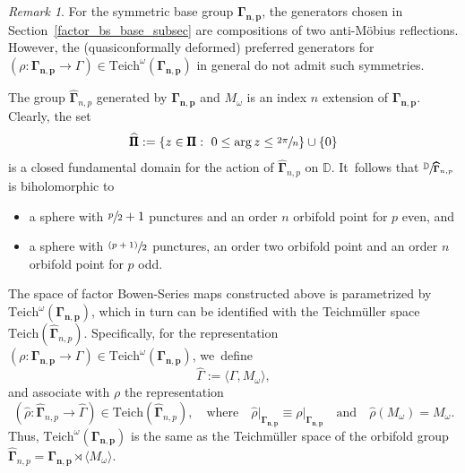\documentclass[JEP,XML,SOM,Unicode,NoFloatCountersInSection,published]{cedram}
\newcommand{\psfrac}[2]{\sfrac{(#1)}{#2}}
\let\faktor\sfrac
\theoremstyle{definition}
\theoremstyle{remark}
\newtheorem{remark}[lemma]{Remark}
\newcommand{\D}{\mathbb{D}}
\begin{document}
\begin{remark}
For the symmetric base group $\pmb{\Gamma_{n,p}}$, the generators chosen in Section~\ref{factor_bs_base_subsec} are compositions of two anti-Möbius reflections. However, the (quasiconformally deformed) preferred generators for $(\rho: \pmb{\Gamma_{n,p}}\to\Gamma)\in \mathrm{Teich}^\omega(\pmb{\Gamma_{n,p}})$ in general do not admit such symmetries.
\end{remark}

The group $\widehat{\pmb{\Gamma}}_{n,p}$ generated by $\pmb{\Gamma_{n,p}}$ and $M_\omega$ is an index $n$ extension of $\pmb{\Gamma_{n,p}}$. Clearly, the set
\[
\widehat{\pmb{\Pi}}:=\{ z\in\pmb{\Pi}:\ 0\leq\arg{z}\leq\sfrac{2\pi}{n}\}\cup\{0\}
\]
is a closed fundamental domain for the action of $\widehat{\pmb{\Gamma}}_{n,p}$ on $\D$. It~follows that $\faktor{\D}{\pmb{\widehat{\Gamma}}_{n,p}}$ is biholomorphic to
\begin{itemize}
\item
a sphere with $\sfrac{p}{2}+1$ punctures and an order $n$ orbifold point for $p$ even, and

\item
a sphere with $\psfrac{p+1}{2}$ punctures, an order two orbifold point and an order $n$ orbifold point for $p$ odd.
\end{itemize}

The space of factor Bowen-Series maps constructed above is parametrized by $\mathrm{Teich}^\omega(\pmb{\Gamma_{n,p}})$, which in turn can be identified with the Teichmüller space $\mathrm{Teich}(\widehat{\pmb{\Gamma}}_{n,p})$. Specifically, for the representation $(\rho: \pmb{\Gamma_{n,p}}\to\Gamma)\in \mathrm{Teich}^\omega(\pmb{\Gamma_{n,p}})$, we~define
\[
\widehat{\Gamma}:=\langle\Gamma, M_\omega\rangle,
\]
and associate with $\rho$ the representation
\[
(\widehat{\rho}: \widehat{\pmb{\Gamma}}_{n,p}\to\widehat{\Gamma})\in \mathrm{Teich}(\widehat{\pmb{\Gamma}}_{n,p}),\quad \text{where}\quad \widehat{\rho}\vert_{\pmb{\Gamma_{n,p}}}\equiv\rho\vert_{\pmb{\Gamma_{n,p}}}\quad \text{and}\quad \widehat{\rho}(M_\omega)=M_\omega.
\]
Thus, $\mathrm{Teich}^\omega(\pmb{\Gamma_{n,p}})$ is the same as the Teichmüller space of the orbifold group
$\widehat{\pmb{\Gamma}}_{n,p}=\pmb{\Gamma_{n,p}} \rtimes \langle M_\omega\rangle$.
\end{document}
